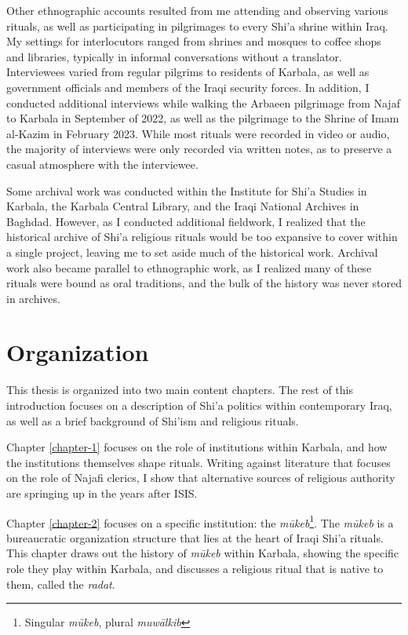 Other ethnographic accounts resulted from me attending and observing various rituals, as well as participating in pilgrimages to every Shi'a shrine within Iraq. My settings for interlocutors ranged from shrines and mosques to coffee shops and libraries, typically in informal conversations without a translator. Interviewees varied from regular pilgrims to residents of Karbala, as well as government officials and members of the Iraqi security forces. In addition, I conducted additional interviews while walking the Arbaeen pilgrimage from Najaf to Karbala in September of 2022, as well as the pilgrimage to the Shrine of Imam al-Kazim in February 2023. While most rituals were recorded in video or audio, the majority of interviews were only recorded via written notes, as to preserve a casual atmosphere with the interviewee. 

Some archival work was conducted within the Institute for Shi'a Studies in Karbala, the Karbala Central Library, and the Iraqi National Archives in Baghdad. However, as I conducted additional fieldwork, I realized that the historical archive of Shi'a religious rituals would be too expansive to cover within a single project, leaving me to set aside much of the historical work. Archival work also became parallel to ethnographic work, as I realized many of these rituals were bound as oral traditions, and the bulk of the history was never stored in archives. 

\section{Organization}

This thesis is organized into two main content chapters. The rest of this introduction focuses on a description of Shi'a politics within contemporary Iraq, as well as a brief background of Shi'ism and religious rituals.

Chapter \ref{chapter-1} focuses on the role of institutions within Karbala, and how the institutions themselves shape rituals. Writing against literature that focuses on the role of Najafi clerics, I show that alternative sources of religious authority are springing up in the years after ISIS.

Chapter \ref{chapter-2} focuses on a specific institution: the \emph{mūkeb}\footnote{Singular \emph{mūkeb}, plural \emph{muwālkib}}. The \emph{mūkeb} is a bureaucratic organization structure that lies at the heart of Iraqi Shi'a rituals. This chapter draws out the history of \emph{mūkeb} within Karbala, showing the specific role they play within Karbala, and discusses a religious ritual that is native to them, called the \emph{radat}.

